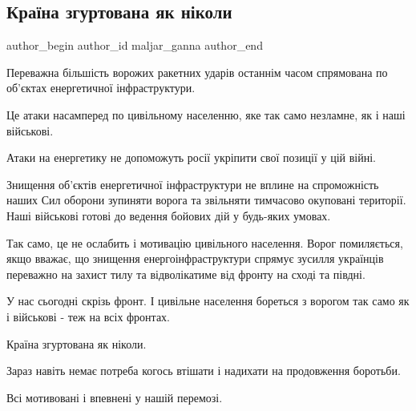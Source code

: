  
 
 
 
 
 
\subsection{Країна згуртована як ніколи}
\label{sec:23_11_2022.fb.maljar_ganna.1.kraina_zgurtovana}
 
\ifcmt
 author_begin
   author_id maljar_ganna
 author_end
\fi

Переважна більшість ворожих ракетних ударів останнім часом спрямована по
об'єктах енергетичної інфраструктури.

Це атаки насамперед по цивільному населенню, яке так само незламне, як і наші
військові. 

Атаки на енергетику не допоможуть росії укріпити свої позиції у цій війні. 

Знищення об'єктів енергетичної інфраструктури не вплине на спроможність наших
Сил оборони зупиняти ворога та звільняти тимчасово окуповані території. Наші
військові готові до ведення бойових дій у будь-яких умовах. 

Так само, це не ослабить і мотивацію цивільного населення. Ворог помиляється,
якщо  вважає, що знищення енергоінфраструктури спрямує зусилля українців
переважно на захист тилу та відволікатиме від фронту на сході та півдні. 

У нас сьогодні скрізь фронт. І цивільне населення бореться з ворогом так само
як і військові - теж на всіх фронтах. 

Країна згуртована як ніколи. 

Зараз навіть немає потреба когось втішати і надихати на продовження боротьби. 

Всі мотивовані і впевнені у нашій перемозі.

